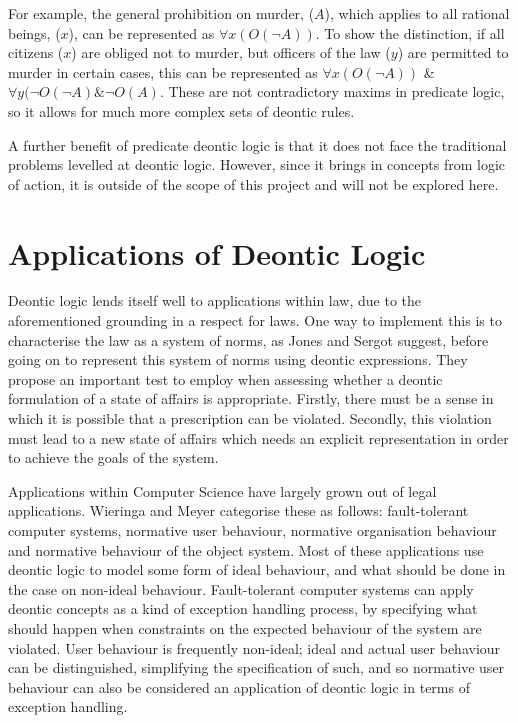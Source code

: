 \documentclass{l4proj}
\begin{document}
For example, the general prohibition on murder, ($A$), which applies to all rational beings, ($x$), can be represented as \( \forall{x(O( \neg A))} \). To show the distinction, if all citizens ($x$) are obliged not to murder, but officers of the law ($y$) are permitted to murder in certain cases, this can be represented as \( \forall{x(O( \neg A))} \) \& \( \forall{y( \neg O( \neg A) \& \neg O(A)} \). These are not contradictory maxims in predicate logic, so it allows for much more complex sets of deontic rules. 

A further benefit of predicate deontic logic is that it does not face the traditional problems levelled at deontic logic\cite{predicate}. However, since it brings in concepts from logic of action, it is outside of the scope of this project and will not be explored here. 

\section{Applications of Deontic Logic}
Deontic logic lends itself well to applications within law, due to the aforementioned grounding in a respect for laws. One way to implement this is to characterise the law as a system of norms, as Jones and Sergot suggest\cite{law-jonessergot}, before going on to represent this system of norms using deontic expressions. They propose an important test to employ when assessing whether a deontic formulation of a state of affairs is appropriate. Firstly, there must be a sense in which it is possible that a prescription can be violated. Secondly, this violation must lead to a new state of affairs which needs an explicit representation in order to achieve the goals of the system. 

Applications within Computer Science have largely grown out of legal applications. Wieringa and Meyer categorise these as follows\cite{meyer93applications}: fault-tolerant computer systems, normative user behaviour, normative organisation behaviour and normative behaviour of the object system. Most of these applications use deontic logic to model some form of ideal behaviour, and what should be done in the case on non-ideal behaviour. Fault-tolerant computer systems can apply deontic concepts as a kind of exception handling process, by specifying what should happen when constraints on the expected behaviour of the system are violated. User behaviour is frequently non-ideal; ideal and actual user behaviour can be distinguished, simplifying the specification of such, and so normative user behaviour can also be considered an application of deontic logic in terms of exception handling. 
\end{document}
